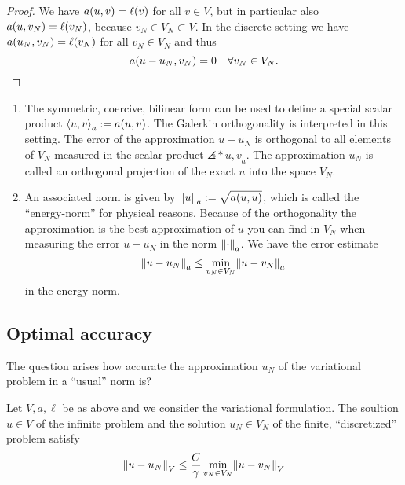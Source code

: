 \begin{proof}
    We have \(a\parentheses*{u, v} = \ell\parentheses*{v}\) for all \(v \in V\), but in particular also \(a\parentheses*{u, v_N} = \ell\parentheses*{v_N}\), because \(v_N \in V_N \subset V\).
    In the discrete setting we have \(a\parentheses*{u_N, v_N} = \ell\parentheses*{v_N}\) for all \(v_N \in V_N\) and thus
    \[
        a\parentheses*{u - u_N, v_N} = 0 \quad \forall v_N \in V_N.
    \]
\end{proof}

\begin{remark}
    \begin{enumerate}
        \item The symmetric, coercive, bilinear form can be used to define a special scalar product \(\angles*{u, v}_a := a\parentheses*{u, v}\).
        The Galerkin orthogonality is interpreted in this setting.
        The error of the approximation \(u - u_N\) is orthogonal to all elements of \(V_N\) measured in the scalar product \(\angles*{u, v}_a\).
        The approximation \(u_N\) is called an orthogonal projection of the exact \(u\) into the space \(V_N\).
        \item An associated norm is given by \(\norm*{u}_a := \sqrt{a\parentheses*{u, u}}\), which is called the ``energy-norm'' for physical reasons.
        Because of the orthogonality the approximation is the best approximation of \(u\) you can find in \(V_N\) when measuring the error \(u - u_N\) in the norm \(\norm*{\cdot}_a\).
        We have the error estimate
        \[
            \norm*{u - u_N}_a \le \min_{v_N \in V_N}\norm*{u - v_N}_a
        \]
        in the energy norm.
    \end{enumerate}
\end{remark}


\subsection{Optimal accuracy}

The question arises how accurate the approximation \(u_N\) of the variational problem in a ``usual'' norm is?

\begin{theorem}
    Let \(V, a, \ell\) be as above and we consider the variational formulation.
    The soultion \(u \in V\) of the infinite problem and the solution \(u_N \in V_N\) of the finite, ``discretized'' problem satisfy
    \[
        \norm*{u - u_N}_V \le \frac{C}{\gamma}\min_{v_N \in V_N}\norm*{u - v_N}_V
    \]
\end{theorem}

